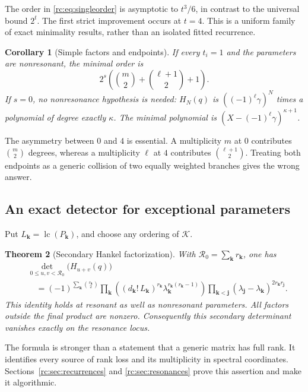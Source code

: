 \documentclass[11pt,a4paper]{article}
\numberwithin{equation}{section}
\newtheorem{theorem}{Theorem}[section]
\newtheorem{corollary}[theorem]{Corollary}
\theoremstyle{definition}
\theoremstyle{remark}
\newcommand{\lc}{\operatorname{lc}}
\newcommand{\bk}{\boldsymbol{k}}
\newcommand{\bj}{\boldsymbol{j}}
\newcommand{\Rzero}{\mathcal R_0}
\begin{document}
The order in \eqref{rc:eq:singleorder} is asymptotic to $t^3/6$, in contrast
to the universal bound $2^t$.  The first strict improvement occurs at
$t=4$.  This is a uniform family of exact minimality results, rather than
an isolated fitted recurrence.

\begin{corollary}[Simple factors and endpoints]\label{rc:cor:simple}
If every $t_i=1$ and the parameters are nonresonant, the minimal order is
\begin{equation}\label{rc:eq:simpleorder}
 2^s\left(\binom m2+\binom{\ell+1}2+1\right).
\end{equation}
If $s=0$, no nonresonance hypothesis is needed: $H_N(q)$ is
$((-1)^\ell\gamma)^N$ times a polynomial of degree exactly $\kappa$.
The minimal polynomial is
$(X-(-1)^\ell\gamma)^{\kappa+1}$.
\end{corollary}

The asymmetry between $0$ and $4$ is essential.  A multiplicity $m$ at
$0$ contributes $\binom m2$ degrees, whereas a multiplicity $\ell$ at
$4$ contributes $\binom{\ell+1}2$.  Treating both endpoints as a generic
collision of two equally weighted branches gives the wrong answer.

\subsection{An exact detector for exceptional parameters}
Put $L_{\bk}=\lc(P_{\bk})$, and choose any ordering of $\mathcal K$.
\begin{theorem}[Secondary Hankel factorization]\label{rc:thm:secondary}
With $\Rzero=\sum_{\bk}r_{\bk}$, one has
\begin{align}
 &\det_{0\le u,v<\Rzero}\bigl(H_{u+v}(q)\bigr)\nonumber\\
 &\quad=(-1)^{\sum_{\bk}\binom{r_{\bk}}2}
   \prod_{\bk}
     \left((d_{\bk}!\,L_{\bk})^{r_{\bk}}
                 \lambda_{\bk}^{r_{\bk}(r_{\bk}-1)}\right)
   \prod_{\bk<\bj}
     (\lambda_{\bj}-\lambda_{\bk})^{2r_{\bk}r_{\bj}}.
 \label{rc:eq:secondary}
\end{align}
This identity holds at resonant as well as nonresonant parameters.
All factors outside the final product are nonzero.  Consequently this
secondary determinant vanishes exactly on the resonance locus.
\end{theorem}

The formula is stronger than a statement that a generic matrix has full
rank.  It identifies every source of rank loss and its multiplicity in
spectral coordinates.  Sections~\ref{rc:sec:recurrences} and
\ref{rc:sec:resonances} prove this assertion and make it algorithmic.
\end{document}
